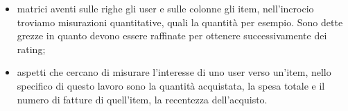
\begin{itemize} 
	\item {} matrici aventi sulle righe gli user e sulle colonne gli item, nell'incrocio troviamo misurazioni quantitative, quali la quantità per esempio. Sono dette grezze in quanto devono essere raffinate per ottenere successivamente dei rating;
	\item {} aspetti che cercano di misurare l'interesse di uno user verso un'item, nello specifico di questo lavoro sono la quantità acquistata, la spesa totale e il numero di fatture di quell'item, la recentezza dell'acquisto.
\end{itemize}